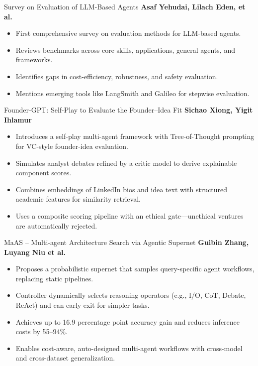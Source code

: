 \documentclass{beamer}
\begin{document}
\begin{frame}{Survey on Evaluation of LLM-Based Agents  }
\large\textbf{Asaf Yehudai, Lilach Eden, et al.}

\normalsize
\begin{itemize}
  \item First comprehensive survey on evaluation methods for LLM-based agents.
  \item Reviews benchmarks across core skills, applications, general agents, and frameworks.
  \item Identifies gaps in cost-efficiency, robustness, and safety evaluation.
  \item Mentions emerging tools like LangSmith and Galileo for stepwise evaluation.
\end{itemize}

\end{frame}


\begin{frame}{Founder-GPT: Self-Play to Evaluate the Founder–Idea Fit}
\large\textbf{Sichao Xiong, Yigit Ihlamur}

\normalsize
\begin{itemize}
 \item Introduces a self-play multi-agent framework with Tree-of-Thought prompting for VC-style founder-idea evaluation.
    \item Simulates analyst debates refined by a critic model to derive explainable component scores.
    \item Combines embeddings of LinkedIn bios and idea text with structured academic features for similarity retrieval.
    \item Uses a composite scoring pipeline with an ethical gate—unethical ventures are automatically rejected.
\end{itemize}
\end{frame}







\begin{frame}{MaAS – Multi-agent Architecture Search via Agentic Supernet }
\large\textbf{Guibin Zhang, Luyang Niu et al.}

\normalsize
\begin{itemize}
  \item Proposes a probabilistic supernet that samples query-specific agent workflows, replacing static pipelines.
    \item Controller dynamically selects reasoning operators (e.g., I/O, CoT, Debate, ReAct) and can early-exit for simpler tasks.
    \item Achieves up to 16.9 percentage point accuracy gain and reduces inference costs by 55–94\%.
    \item Enables cost-aware, auto-designed multi-agent workflows with cross-model and cross-dataset generalization.
\end{itemize}
\end{frame}
\end{document}
